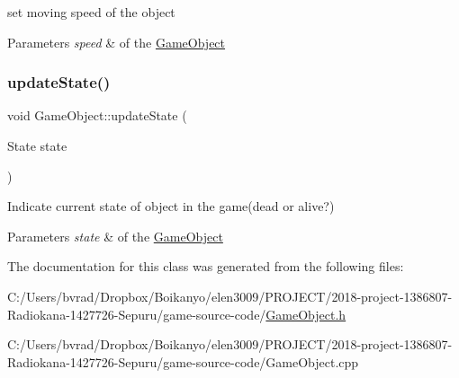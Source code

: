 set moving speed of the object 


\begin{DoxyParams}{Parameters}
{\em speed} & of the \mbox{\hyperlink{class_game_object}{Game\+Object}} \\
\hline
\end{DoxyParams}
\mbox{\label{class_game_object_a77c7875aa47e873967324113060ed2e9}} 
\subsubsection{\texorpdfstring{update\+State()}{updateState()}}
{\footnotesize\ttfamily void Game\+Object\+::update\+State (\begin{DoxyParamCaption}\item[{State}]{state }\end{DoxyParamCaption})}



Indicate current state of object in the game(dead or alive?) 


\begin{DoxyParams}{Parameters}
{\em state} & of the \mbox{\hyperlink{class_game_object}{Game\+Object}} \\
\hline
\end{DoxyParams}


The documentation for this class was generated from the following files\+:\begin{DoxyCompactItemize}
\item 
C\+:/\+Users/bvrad/\+Dropbox/\+Boikanyo/elen3009/\+P\+R\+O\+J\+E\+C\+T/2018-\/project-\/1386807-\/\+Radiokana-\/1427726-\/\+Sepuru/game-\/source-\/code/\mbox{\hyperlink{_game_object_8h}{Game\+Object.\+h}}\item 
C\+:/\+Users/bvrad/\+Dropbox/\+Boikanyo/elen3009/\+P\+R\+O\+J\+E\+C\+T/2018-\/project-\/1386807-\/\+Radiokana-\/1427726-\/\+Sepuru/game-\/source-\/code/Game\+Object.\+cpp\end{DoxyCompactItemize}

